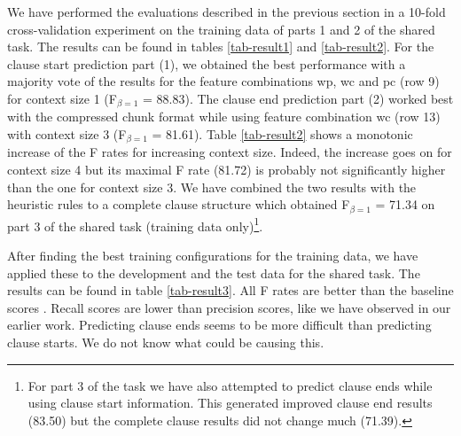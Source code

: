 \documentclass[11pt]{article}
\begin{document}
We have performed the evaluations described in the previous section in
a 10-fold cross-validation experiment on the training data of parts 1
and 2 of the shared task.
The results can be found in tables \ref{tab-result1} and
\ref{tab-result2}.
For the clause start prediction part (1), we obtained the best
performance with a majority vote of the results for the feature
combinations wp, wc and pc (row 9) for context size 1 (F$_{\beta=1}$ = 
88.83). 
The clause end prediction part (2) worked best with the compressed
chunk format while using feature combination wc (row 13) with context
size 3 (F$_{\beta=1}$ = 81.61).
Table \ref{tab-result2} shows a monotonic increase of the F rates 
for increasing context size.
Indeed, the increase goes on for context size 4 but its maximal F rate
(81.72) is probably not significantly higher than the one for context
size 3.
We have combined the two results with the heuristic rules to a
complete clause structure which obtained F$_{\beta=1}$ = 71.34 on
part 3 of the shared task (training data only)\footnote{
For part 3 of the task we have also attempted to predict clause ends
while using clause start information.
This generated improved clause end results (83.50) but the complete
clause results did not change much (71.39).
}.


After finding the best training configurations for the training data,
we have applied these to the development and the test data for the
shared task. 
The results can be found in table \ref{tab-result3}.
All F rates are better than the baseline scores \cite{tksdj2001}.
Recall scores are lower than precision scores, like we have observed
in our earlier work.
Predicting clause ends seems to be more difficult than predicting
clause starts.
We do not know what could be causing this.
\end{document}
